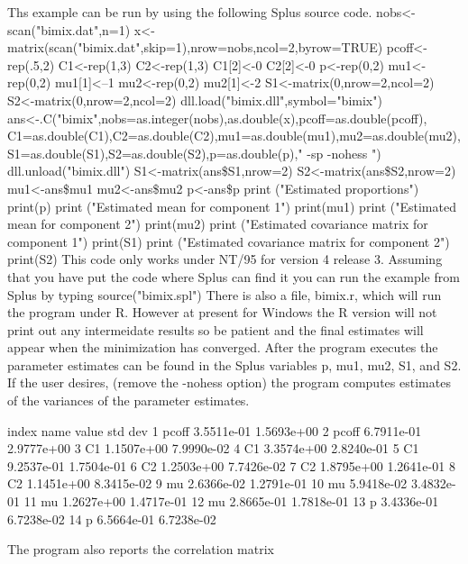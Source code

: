 {{{{{{{{Ths example can be run by using the following Splus source code.
\beginexample
 nobs<-scan("bimix.dat",n=1)
 x<-matrix(scan("bimix.dat",skip=1),nrow=nobs,ncol=2,byrow=TRUE)
 pcoff<-rep(.5,2)
 C1<-rep(1,3)
 C2<-rep(1,3)
 C1[2]<-0
 C2[2]<-0
 p<-rep(0,2)
 mu1<-rep(0,2)
 mu1[1]<--1
 mu2<-rep(0,2)
 mu2[1]<-2
 S1<-matrix(0,nrow=2,ncol=2)
 S2<-matrix(0,nrow=2,ncol=2)
 dll.load("bimix.dll",symbol="bimix")
 ans<-.C("bimix",nobs=as.integer(nobs),as.double(x),pcoff=as.double(pcoff),
   C1=as.double(C1),C2=as.double(C2),mu1=as.double(mu1),mu2=as.double(mu2),
   S1=as.double(S1),S2=as.double(S2),p=as.double(p)," -sp -nohess ") 
 dll.unload("bimix.dll")
 S1<-matrix(ans\$S1,nrow=2)  
 S2<-matrix(ans\$S2,nrow=2)  
 mu1<-ans\$mu1
 mu2<-ans\$mu2
 p<-ans\$p
 print ("Estimated proportions")
 print(p)
 print ("Estimated mean for component 1")
 print(mu1)
 print ("Estimated mean for component 2")
 print(mu2)
 print ("Estimated covariance matrix for component 1")
 print(S1)
 print ("Estimated covariance matrix for component 2")
 print(S2)
\endexample
This code  only works under NT/95 for version 4 release 3.
Assuming that you have put the code where Splus can find it you can
run the example from Splus by typing
\beginexample
source("bimix.spl")
\endexample
There is also a file, bimix.r, which will run the program under R.
However at present for Windows the R version will not print out any
intermeidate results so be patient and the final estimates will appear
when the minimization has converged.
After the program executes the parameter estimates can be found in
the Splus variables p, mu1, mu2, S1, and S2.
If the user desires, (remove the -nohess option)
the program computes estimates 
of the variances of the parameter estimates.

\beginexample
 index   name   value      std dev   
    1   pcoff  3.5511e-01  1.5693e+00
    2   pcoff  6.7911e-01  2.9777e+00
    3   C1     1.1507e+00  7.9990e-02
    4   C1     3.3574e+00  2.8240e-01
    5   C1     9.2537e-01  1.7504e-01
    6   C2     1.2503e+00  7.7426e-02
    7   C2     1.8795e+00  1.2641e-01
    8   C2     1.1451e+00  8.3415e-02
    9   mu     2.6366e-02  1.2791e-01
   10   mu     5.9418e-02  3.4832e-01
   11   mu     1.2627e+00  1.4717e-01
   12   mu     2.8665e-01  1.7818e-01
   13   p      3.4336e-01  6.7238e-02
   14   p      6.5664e-01  6.7238e-02
\endexample

The program also reports the correlation matrix

}}}}}}}}
